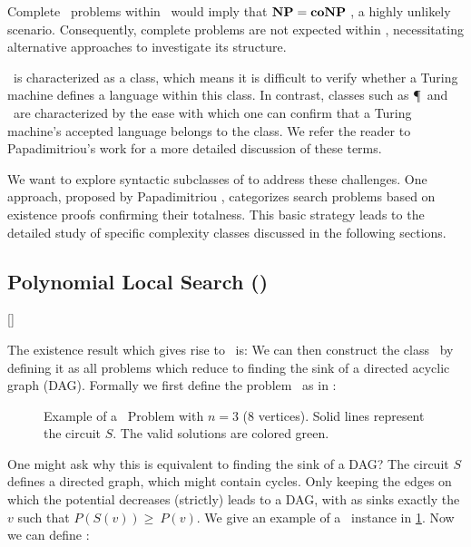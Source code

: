 Complete \FNP\ problems within \TFNP\ would imply that $\textbf{NP} = \textbf{coNP}$ , a highly unlikely scenario. Consequently, complete problems are not expected within \TFNP, necessitating alternative approaches to investigate its structure.

\TFNP\ is characterized as a  class, which means it is difficult to verify whether a Turing machine defines a language within this class. In contrast,  classes such as \P\, and \NP\ are characterized by the ease with which one can confirm that a Turing machine's accepted language belongs to the class. We refer the reader to Papadimitriou's work  for a more detailed discussion of these terms.

We want to explore syntactic subclasses of \TFNP to address these challenges. One approach, proposed by Papadimitriou \cite{papadimitriou_computational_1994}, categorizes search problems based on existence proofs confirming their totalness. This basic strategy leads to the detailed study of specific complexity classes discussed in the following sections.

\subsection{Polynomial Local Search (\PLS)}[\PLS]

The existence result which gives rise to \PLS\ is:
We can then construct the class \PLS\ by defining it as all problems which reduce to finding the sink of a directed acyclic graph (DAG). Formally we first define the problem \Localopt\ as in :


\begin{figure}
    \centering
    \caption[Example of a \Localopt\ Problem]{Example of a \Localopt\ Problem with $n=3$ (8 vertices). Solid lines represent the circuit $S$. The valid solutions are colored green.}
    \label{fig:localopt_example}
\end{figure}

One might ask why this is equivalent to finding the sink of a DAG\@? The circuit $S$ defines a directed graph, which might contain cycles. Only keeping the edges on which the potential decreases (strictly) leads to a DAG, with as sinks exactly the $v$ such that $P(S(v)) \geq\ P(v)$. We give an example of a \Localopt\ instance in \cref{fig:localopt_example}. Now we can define \PLS:

